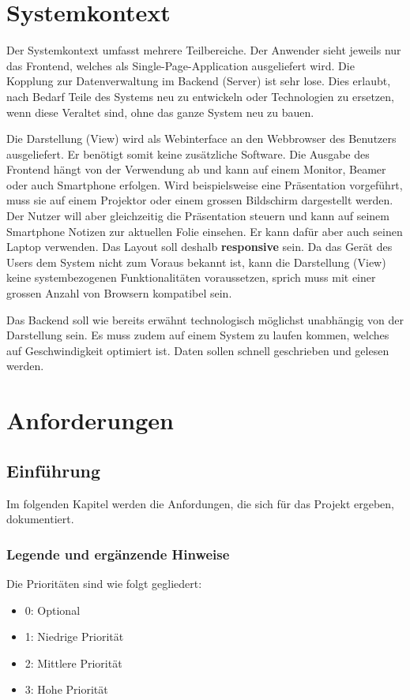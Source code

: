 \section{Systemkontext}
\label{sec:systemkontext}
Der Systemkontext umfasst mehrere Teilbereiche. Der Anwender sieht jeweils nur das Frontend, welches als Single-Page-Application ausgeliefert wird. Die Kopplung zur Datenverwaltung im Backend (Server) ist sehr lose. Dies erlaubt, nach Bedarf Teile des Systems neu zu entwickeln oder Technologien zu ersetzen, wenn diese Veraltet sind, ohne das ganze System neu zu bauen. 

Die Darstellung (View) wird als Webinterface an den Webbrowser des Benutzers ausgeliefert. Er benötigt somit keine zusätzliche Software. Die Ausgabe des Frontend hängt von der Verwendung ab und kann auf einem Monitor, Beamer oder auch Smartphone erfolgen. Wird beispielsweise eine Präsentation vorgeführt, muss sie auf einem Projektor oder einem grossen Bildschirm dargestellt werden. Der Nutzer will aber gleichzeitig die Präsentation steuern und kann auf seinem Smartphone Notizen zur aktuellen Folie einsehen. Er kann dafür aber auch seinen Laptop verwenden. Das Layout soll deshalb \textbf{responsive} sein. Da das Gerät des Users dem System nicht zum Voraus bekannt ist, kann die Darstellung (View) keine systembezogenen Funktionalitäten voraussetzen, sprich muss mit einer grossen Anzahl von Browsern kompatibel sein.

Das Backend soll wie bereits erwähnt technologisch möglichst unabhängig von der Darstellung sein. Es muss zudem auf einem System zu laufen kommen, welches auf Geschwindigkeit optimiert ist. Daten sollen schnell geschrieben und gelesen werden. 

\section{Anforderungen}
\label{sec:anforderungen}

\subsection{Einführung}
Im folgenden Kapitel werden die Anfordungen, die sich für das Projekt ergeben, dokumentiert. 

\subsubsection{Legende und ergänzende Hinweise}

Die Prioritäten sind wie folgt gegliedert:
\begin{itemize}
	\item 0: Optional
	\item 1: Niedrige Priorität
	\item 2: Mittlere Priorität
	\item 3: Hohe Priorität
\end{itemize}

